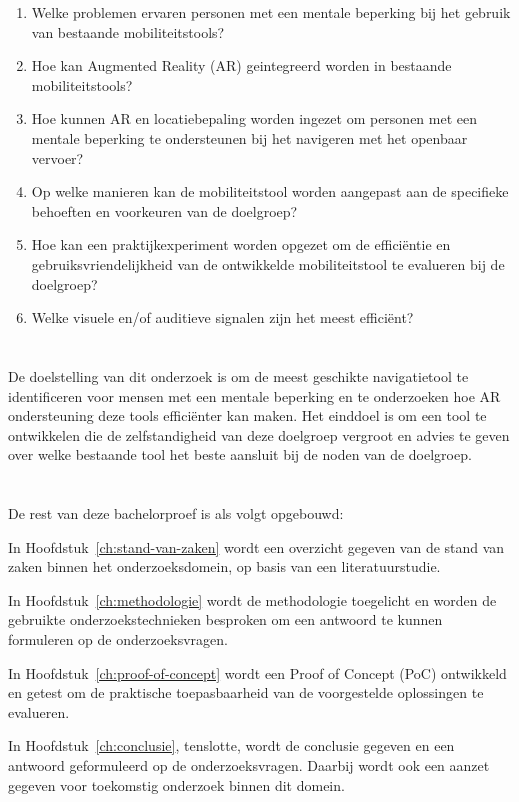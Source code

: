 \begin{enumerate}
    \item Welke problemen ervaren personen met een mentale beperking bij het gebruik van bestaande mobiliteitstools?
    \item Hoe kan Augmented Reality (AR) geintegreerd worden in bestaande mobiliteitstools?
    \item Hoe kunnen AR en locatiebepaling worden ingezet om personen met een mentale beperking te ondersteunen bij het navigeren met het openbaar vervoer?
    \item Op welke manieren kan de mobiliteitstool worden aangepast aan de specifieke behoeften en voorkeuren van de doelgroep?
    \item Hoe kan een praktijkexperiment worden opgezet om de efficiëntie en gebruiksvriendelijkheid van de ontwikkelde mobiliteitstool te evalueren bij de doelgroep?
    \item Welke visuele en/of auditieve signalen zijn het meest efficiënt? %
\end{enumerate}

\section{}%
\label{sec:onderzoeksdoelstelling}

De doelstelling van dit onderzoek is om de meest geschikte navigatietool te identificeren voor mensen met een mentale beperking en te onderzoeken hoe AR ondersteuning deze tools efficiënter kan maken. Het einddoel is om een tool te ontwikkelen die de zelfstandigheid van deze doelgroep vergroot en advies te geven over welke bestaande tool het beste aansluit bij de noden van de doelgroep.

\section{}%
\label{sec:opzet-bachelorproef}

De rest van deze bachelorproef is als volgt opgebouwd:

In Hoofdstuk~\ref{ch:stand-van-zaken} wordt een overzicht gegeven van de stand van zaken binnen het onderzoeksdomein, op basis van een literatuurstudie.

In Hoofdstuk~\ref{ch:methodologie} wordt de methodologie toegelicht en worden de gebruikte onderzoekstechnieken besproken om een antwoord te kunnen formuleren op de onderzoeksvragen.

In Hoofdstuk~\ref{ch:proof-of-concept} wordt een Proof of Concept (PoC) ontwikkeld en getest om de praktische toepasbaarheid van de voorgestelde oplossingen te evalueren.

In Hoofdstuk~\ref{ch:conclusie}, tenslotte, wordt de conclusie gegeven en een antwoord geformuleerd op de onderzoeksvragen. Daarbij wordt ook een aanzet gegeven voor toekomstig onderzoek binnen dit domein.
